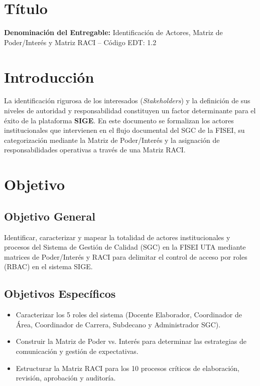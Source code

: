 \documentclass[12pt,a4paper]{article}
\begin{document}

\vspace{0.25cm}
\section{Título}
\textbf{Denominación del Entregable:} Identificación de Actores, Matriz de Poder/Interés y Matriz RACI -- Código EDT: 1.2



\section{Introducción}
La identificación rigurosa de los interesados (\textit{Stakeholders}) y la definición de sus niveles de autoridad y responsabilidad constituyen un factor determinante para el éxito de la plataforma \textbf{SIGE}. En este documento se formalizan los actores institucionales que intervienen en el flujo documental del SGC de la FISEI, su categorización mediante la Matriz de Poder/Interés y la asignación de responsabilidades operativas a través de una Matriz RACI.

\section{Objetivo}

\subsection{Objetivo General}
Identificar, caracterizar y mapear la totalidad de actores institucionales y procesos del Sistema de Gestión de Calidad (SGC) en la FISEI UTA mediante matrices de Poder/Interés y RACI para delimitar el control de acceso por roles (RBAC) en el sistema SIGE.

\subsection{Objetivos Específicos}
\begin{itemize}[leftmargin=1.5em, itemsep=1.5pt]
    \item Caracterizar los 5 roles del sistema (Docente Elaborador, Coordinador de Área, Coordinador de Carrera, Subdecano y Administrador SGC).
    \item Construir la Matriz de Poder vs. Interés para determinar las estrategias de comunicación y gestión de expectativas.
    \item Estructurar la Matriz RACI para los 10 procesos críticos de elaboración, revisión, aprobación y auditoría.
\end{itemize}
\end{document}
